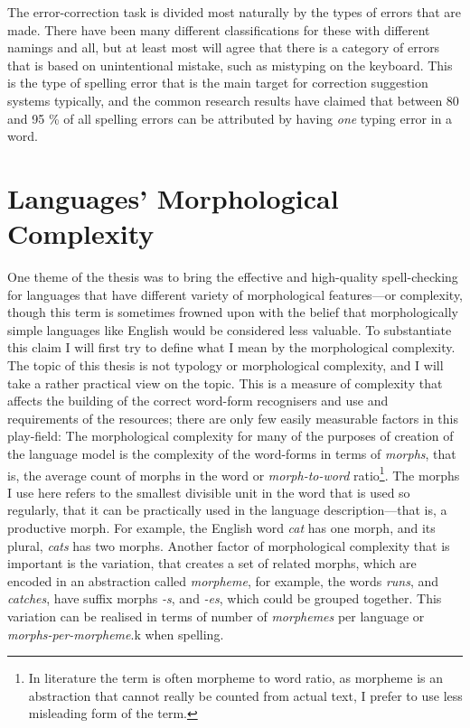 \documentclass[officiallayout]{unihelcompling}
\begin{document}
The error-correction task is divided most naturally by the types of errors that
are made. There have been many different classifications for these with
different namings and all, but at least most will agree that there is a
category of errors that is based on unintentional mistake, such as
mistyping on the keyboard. This is the type of spelling error that is the
main target for correction suggestion systems typically, and the common
research results have claimed that between 80 and 95 \% of all spelling
errors can be attributed by having \emph{one} typing error in a word.



\section{Languages' Morphological Complexity}
\label{sec:morphological-complexity}

One theme of the thesis was to bring the effective and high-quality
spell-checking for languages that have different variety of morphological
features---or complexity, though this term is sometimes frowned upon with the
belief that morphologically simple languages like English would be considered
less valuable. To substantiate this claim I will first try to define what I
mean by the morphological complexity. The topic of this thesis is not typology
or morphological complexity, and I will take a rather practical view on the
topic. This is a measure of complexity that affects the building of the correct
word-form recognisers and use and requirements of the resources; there are only
few easily measurable factors in this play-field: The morphological complexity
for many of the purposes of creation of the language model is the complexity of
the word-forms in terms of \emph{morphs}, that is, the average count of morphs
in the word or \emph{morph-to-word} ratio\footnote{In literature the term is
often morpheme to word ratio, as morpheme is an abstraction that cannot really
be counted from actual text, I prefer to use less misleading form of the
term.}. The morphs I use here refers to the smallest divisible unit in the word
that is used so regularly, that it can be practically used in the language
description---that is, a productive morph. For example, the English word
\emph{cat} has one morph, and its plural, \emph{cats} has two morphs.  Another
factor of morphological complexity that is important is the variation, that
creates a set of related morphs, which are encoded in an abstraction called
\emph{morpheme}, for example, the words \emph{runs}, and \emph{catches}, have
suffix morphs \emph{-s}, and \emph{-es}, which could be grouped together. This
variation can be realised in terms of number of \emph{morphemes} per language
or \emph{morphs-per-morpheme}.k when spelling.
\end{document}
